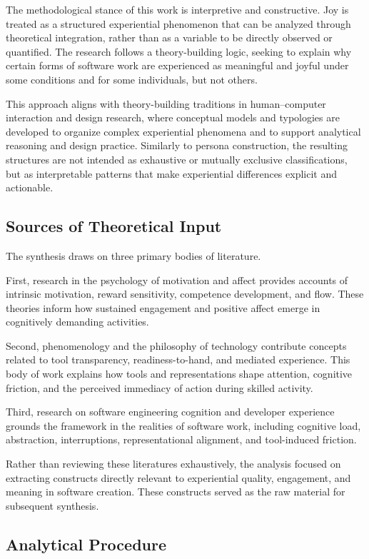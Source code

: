 \documentclass[12pt]{elsarticle}
\begin{document}
The methodological stance of this work is interpretive and constructive. Joy is treated as a structured experiential phenomenon that can be analyzed through theoretical integration, rather than as a variable to be directly observed or quantified. The research follows a theory-building logic, seeking to explain why certain forms of software work are experienced as meaningful and joyful under some conditions and for some individuals, but not others.

This approach aligns with theory-building traditions in human--computer interaction and design research, where conceptual models and typologies are developed to organize complex experiential phenomena and to support analytical reasoning and design practice. Similarly to persona construction, the resulting structures are not intended as exhaustive or mutually exclusive classifications, but as interpretable patterns that make experiential differences explicit and actionable.

\subsection{Sources of Theoretical Input}

The synthesis draws on three primary bodies of literature.

First, research in the psychology of motivation and affect provides accounts of intrinsic motivation, reward sensitivity, competence development, and flow. These theories inform how sustained engagement and positive affect emerge in cognitively demanding activities.

Second, phenomenology and the philosophy of technology contribute concepts related to tool transparency, readiness-to-hand, and mediated experience. This body of work explains how tools and representations shape attention, cognitive friction, and the perceived immediacy of action during skilled activity.

Third, research on software engineering cognition and developer experience grounds the framework in the realities of software work, including cognitive load, abstraction, interruptions, representational alignment, and tool-induced friction.

Rather than reviewing these literatures exhaustively, the analysis focused on extracting constructs directly relevant to experiential quality, engagement, and meaning in software creation. These constructs served as the raw material for subsequent synthesis.

\subsection{Analytical Procedure}
\end{document}
